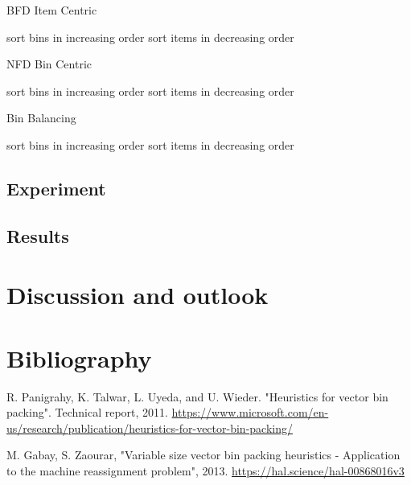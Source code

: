 \documentclass[a4paper,11pt,titlepage]{article}
\begin{document}
\begin{algorithm}
	
		\caption{BFD Item Centric}\label{alg:two}
		sort bins in increasing order\;
		sort items in decreasing order\;
\end{algorithm}

\begin{algorithm}
	
	\caption{NFD Bin Centric}\label{alg:two}
	sort bins in increasing order\;
	sort items in decreasing order\;
	
		
\end{algorithm}


\begin{algorithm}
	
	\caption{Bin Balancing}\label{alg:two}
	sort bins in increasing order\;
	sort items in decreasing order\;
	
	
\end{algorithm}


\subsection{Experiment}
\subsection{Results}

\section{Discussion and outlook}
\lipsum[1-4]
\section{Bibliography}
\begin{thebibliography}{2}
    R. Panigrahy, K. Talwar, L. Uyeda, and U. Wieder. "Heuristics for vector bin packing". Technical report, 2011. \url{https://www.microsoft.com/en-us/research/publication/heuristics-for-vector-bin-packing/}

    M. Gabay, S. Zaourar, "Variable size vector bin packing heuristics - Application to the machine reassignment problem", 2013. \url{https://hal.science/hal-00868016v3} 
\end{thebibliography}
\end{document}
